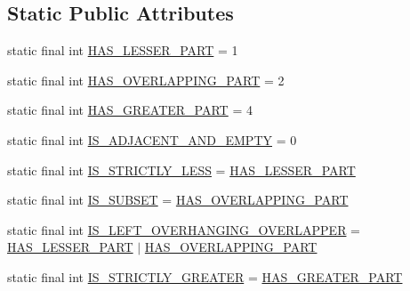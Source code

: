 \subsection*{Static Public Attributes}
\begin{DoxyCompactItemize}
\item 
static final int \hyperlink{interfacebroad_1_1core_1_1datastructures_1_1_interval_a90a558c278b555b5331371115835085e}{H\+A\+S\+\_\+\+L\+E\+S\+S\+E\+R\+\_\+\+P\+A\+R\+T} = 1
\item 
static final int \hyperlink{interfacebroad_1_1core_1_1datastructures_1_1_interval_aa48e3d4d08f9fb5f5a3b866dd0e0f2ff}{H\+A\+S\+\_\+\+O\+V\+E\+R\+L\+A\+P\+P\+I\+N\+G\+\_\+\+P\+A\+R\+T} = 2
\item 
static final int \hyperlink{interfacebroad_1_1core_1_1datastructures_1_1_interval_a82e90efccf2c08433e7400a6ea6e18d7}{H\+A\+S\+\_\+\+G\+R\+E\+A\+T\+E\+R\+\_\+\+P\+A\+R\+T} = 4
\item 
static final int \hyperlink{interfacebroad_1_1core_1_1datastructures_1_1_interval_af0771ee7e0abe266e3cb7a6ee5f0b614}{I\+S\+\_\+\+A\+D\+J\+A\+C\+E\+N\+T\+\_\+\+A\+N\+D\+\_\+\+E\+M\+P\+T\+Y} = 0
\item 
static final int \hyperlink{interfacebroad_1_1core_1_1datastructures_1_1_interval_adaf50ee698921a6dfde3694c0cd4d485}{I\+S\+\_\+\+S\+T\+R\+I\+C\+T\+L\+Y\+\_\+\+L\+E\+S\+S} = \hyperlink{interfacebroad_1_1core_1_1datastructures_1_1_interval_a90a558c278b555b5331371115835085e}{H\+A\+S\+\_\+\+L\+E\+S\+S\+E\+R\+\_\+\+P\+A\+R\+T}
\item 
static final int \hyperlink{interfacebroad_1_1core_1_1datastructures_1_1_interval_ab96286a8ce295314638b2f698a7f106f}{I\+S\+\_\+\+S\+U\+B\+S\+E\+T} = \hyperlink{interfacebroad_1_1core_1_1datastructures_1_1_interval_aa48e3d4d08f9fb5f5a3b866dd0e0f2ff}{H\+A\+S\+\_\+\+O\+V\+E\+R\+L\+A\+P\+P\+I\+N\+G\+\_\+\+P\+A\+R\+T}
\item 
static final int \hyperlink{interfacebroad_1_1core_1_1datastructures_1_1_interval_a4c00f998709fa447253d9404c4c2a7b0}{I\+S\+\_\+\+L\+E\+F\+T\+\_\+\+O\+V\+E\+R\+H\+A\+N\+G\+I\+N\+G\+\_\+\+O\+V\+E\+R\+L\+A\+P\+P\+E\+R} = \hyperlink{interfacebroad_1_1core_1_1datastructures_1_1_interval_a90a558c278b555b5331371115835085e}{H\+A\+S\+\_\+\+L\+E\+S\+S\+E\+R\+\_\+\+P\+A\+R\+T} $\vert$ \hyperlink{interfacebroad_1_1core_1_1datastructures_1_1_interval_aa48e3d4d08f9fb5f5a3b866dd0e0f2ff}{H\+A\+S\+\_\+\+O\+V\+E\+R\+L\+A\+P\+P\+I\+N\+G\+\_\+\+P\+A\+R\+T}
\item 
static final int \hyperlink{interfacebroad_1_1core_1_1datastructures_1_1_interval_ac35f97a7a7298f01b458e2c79befa059}{I\+S\+\_\+\+S\+T\+R\+I\+C\+T\+L\+Y\+\_\+\+G\+R\+E\+A\+T\+E\+R} = \hyperlink{interfacebroad_1_1core_1_1datastructures_1_1_interval_a82e90efccf2c08433e7400a6ea6e18d7}{H\+A\+S\+\_\+\+G\+R\+E\+A\+T\+E\+R\+\_\+\+P\+A\+R\+T}

\end{DoxyCompactItemize}

